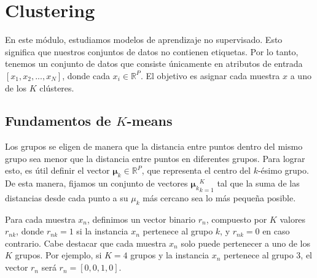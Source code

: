 
\section{Clustering}


En este módulo, estudiamos modelos de aprendizaje no supervisado. Esto significa que nuestros conjuntos de datos no contienen etiquetas. Por lo tanto, tenemos un conjunto de datos que consiste únicamente en atributos de entrada \([x_1,x_2,...,x_N]\), donde cada \(x_i \in \mathbb{R}^P\). El objetivo es asignar cada muestra \(x\) a uno de los \(K\) clústeres.

\begin{figure}[h]
  \centering
  \newcommand{\figscale}{1.35} 
  \scalebox{\figscale}{}
\end{figure}

\subsection{Fundamentos de \texorpdfstring{\(K\)}{K}-means}
Los grupos se eligen de manera que la distancia entre puntos dentro del mismo grupo sea menor que la distancia entre puntos en diferentes grupos. Para lograr esto, es útil definir el vector \(\boldsymbol{\mu}_{k}\in\mathbb{R}^{P}\), que representa el centro del \(k\)-ésimo grupo. De esta manera, fijamos un conjunto de vectores \({\boldsymbol{\mu}_{k}}_{k=1}^{K}\) tal que la suma de las distancias desde cada punto a su \(\mu_{k}\) más cercano sea lo más pequeña posible.

\begin{figure}[h]
    \centering
    \newcommand{\figscale}{1.35}
    \scalebox{\figscale}{}
\end{figure}

Para cada muestra \(x_n\), definimos un vector binario \(r_n\), compuesto por \(K\) valores \(r_{nk}\), donde \(r_{nk} = 1\) si la instancia \(x_n\) pertenece al grupo \(k\), y \(r_{nk}=0\) en caso contrario. Cabe destacar que cada muestra \(x_n\) solo puede pertenecer a uno de los \(K\) grupos. Por ejemplo, si \(K=4\) grupos y la instancia \(x_n\) pertenece al grupo 3, el vector \(r_n\) será \(r_n = [0,0,1,0]\).



